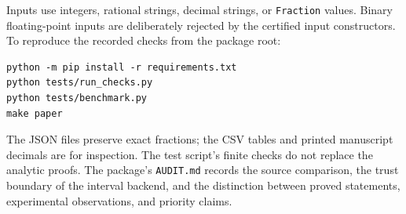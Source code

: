 \documentclass[11pt]{article}
\theoremstyle{definition}
\theoremstyle{remark}
\begin{document}
Inputs use integers, rational strings, decimal strings, or \texttt{Fraction} values. Binary floating-point inputs are deliberately rejected by the certified input constructors. To reproduce the recorded checks from the package root:
\begin{verbatim}
python -m pip install -r requirements.txt
python tests/run_checks.py
python tests/benchmark.py
make paper
\end{verbatim}

The JSON files preserve exact fractions; the CSV tables and printed manuscript decimals are for inspection. The test script's finite checks do not replace the analytic proofs. The package's \texttt{AUDIT.md} records the source comparison, the trust boundary of the interval backend, and the distinction between proved statements, experimental observations, and priority claims.
\end{document}
